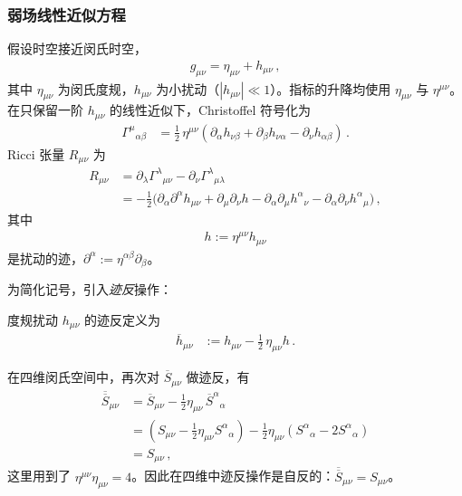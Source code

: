 \subsubsection{弱场线性近似方程}

假设时空接近闵氏时空，
\begin{align}
g_{\mu\nu} = \eta_{\mu\nu} + h_{\mu\nu}\,,
\end{align}
其中 $\eta_{\mu\nu}$ 为闵氏度规，$h_{\mu\nu}$ 为小扰动（$|h_{\mu\nu}|\ll 1$）。指标的升降均使用 $\eta_{\mu\nu}$ 与 $\eta^{\mu\nu}$。在只保留一阶 $h_{\mu\nu}$ 的线性近似下，Christoffel 符号化为
\begin{align}
\Gamma^{\mu}{}_{\alpha\beta}
&=
\frac{1}{2}\,
\eta^{\mu\nu}
\left(
  \partial_{\alpha}h_{\nu\beta}
  + \partial_{\beta}h_{\nu\alpha}
  - \partial_{\nu}h_{\alpha\beta}
\right)\,.
\end{align}
Ricci 张量 $R_{\mu\nu}$ 为
\begin{align}
R_{\mu\nu}
&=
\partial_{\lambda}\Gamma^{\lambda}{}_{\mu\nu}
-
\partial_{\nu}\Gamma^{\lambda}{}_{\mu\lambda}
\\[0.3em]
&=
-\frac{1}{2}
\Big(
  \partial_{\alpha}\partial^{\alpha}h_{\mu\nu}
  + \partial_{\mu}\partial_{\nu}h
  - \partial_{\alpha}\partial_{\mu}h^{\alpha}{}_{\nu}
  - \partial_{\alpha}\partial_{\nu}h^{\alpha}{}_{\mu}
\Big)\,,
\end{align}
其中
\begin{align}
h := \eta^{\mu\nu}h_{\mu\nu}
\end{align}
是扰动的迹，$\partial^{\alpha} := \eta^{\alpha\beta}\partial_{\beta}$。

为简化记号，引入\emph{迹反}操作：
\begin{definition}[迹反扰动张量]
度规扰动 $h_{\mu\nu}$ 的迹反定义为
\begin{align}
\overline{h}_{\mu\nu}
&:=
h_{\mu\nu}
-
\frac{1}{2}\,
\eta_{\mu\nu}h\,.
\end{align}
\end{definition}

\begin{derivationnote}[四维中迹反操作的自反性]
在四维闵氏空间中，再次对 $\overline{S}_{\mu\nu}$ 做迹反，有
\begin{align}
\overline{\overline{S}}_{\mu\nu}
&=
\overline{S}_{\mu\nu}
-
\frac{1}{2}\eta_{\mu\nu}\,\overline{S}^{\alpha}{}_{\alpha}
\\[0.3em]
&=
\left(
  S_{\mu\nu}
  - \frac{1}{2}\eta_{\mu\nu}S^{\alpha}{}_{\alpha}
\right)
-
\frac{1}{2}\eta_{\mu\nu}
\left(
  S^{\alpha}{}_{\alpha}
  - 2 S^{\alpha}{}_{\alpha}
\right)
\\[0.3em]
&=
S_{\mu\nu}\,,
\end{align}
这里用到了 $\eta^{\mu\nu}\eta_{\mu\nu}=4$。因此在四维中迹反操作是自反的：$\overline{\overline{S}}_{\mu\nu}=S_{\mu\nu}$。
\end{derivationnote}

